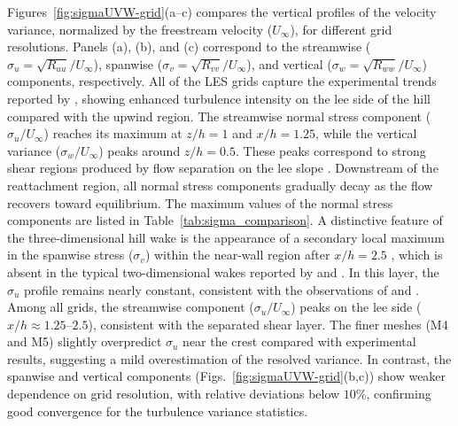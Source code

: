 \documentclass[%
superscriptaddress,
 amsmath,amssymb,
pra,
showkeys,
]{revtex4-2}
\begin{document}
Figures~\ref{fig:sigmaUVW-grid}(a--c) compares the vertical profiles of the velocity variance, normalized by the freestream velocity ($U_\infty$), for different grid resolutions. Panels (a), (b), and (c) correspond to the streamwise ($\sigma_u = \sqrt{R_{uu}}/U_{\infty}$), spanwise ($\sigma_v = \sqrt{R_{vv}}/U_{\infty}$), and vertical ($\sigma_w = \sqrt{R_{ww}}/U_{\infty}$) components, respectively. All of the LES grids capture the experimental trends reported by \citet{ishihara1999wind}, showing enhanced turbulence intensity on the lee side of the hill compared with the upwind region. The streamwise normal stress component ($\sigma_u/U_\infty$) reaches its maximum at $z/h = 1$ and $x/h = 1.25$, while the vertical variance ($\sigma_w/U_\infty$) peaks around $z/h = 0.5$. These peaks correspond to strong shear regions produced by flow separation on the lee slope \cite{ishihara1999wind,diebold2013flow,liu2020wall}. Downstream of the reattachment region, all normal stress components gradually decay as the flow recovers toward equilibrium. The maximum values of the normal stress components are listed in Table~\ref{tab:sigma_comparison}. A distinctive feature of the three-dimensional hill wake is the appearance of a secondary local maximum in the spanwise stress ($\sigma_v$) within the near-wall region after $x/h = 2.5$ \cite{ishihara1999wind}, which is absent in the typical two-dimensional wakes reported by \citet{castro1987structure} and \citet{itoh1989turbulence}. In this layer, the $\sigma_u$ profile remains nearly constant, consistent with the observations of \citet{ishihara1999wind} and \citet{castro1982wind}. Among all grids, the streamwise component ($\sigma_u/U_\infty$) peaks on the lee side ($x/h \approx 1.25$--$2.5$), consistent with the separated shear layer. The finer meshes (M4 and M5) slightly overpredict $\sigma_u$ near the crest compared with experimental results, suggesting a mild overestimation of the resolved variance. In contrast, the spanwise and vertical components (Figs.~\ref{fig:sigmaUVW-grid}(b,c)) show weaker dependence on grid resolution, with relative deviations below $10\%$, confirming good convergence for the turbulence variance statistics.
\end{document}
